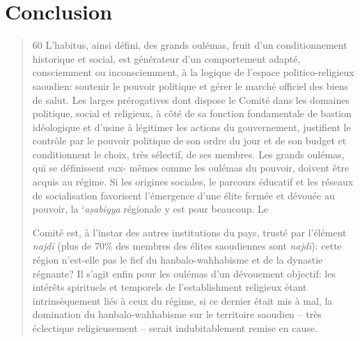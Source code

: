 \hypertarget{conclusion}{%
\section{Conclusion}\label{conclusion}}

\begin{quote}
60 L'habitus, ainsi défini, des grands oulémas, fruit d'un
conditionnement historique et social, est générateur d'un comportement
adapté, consciemment ou inconsciemment, à la logique de l'espace
politico-religieux saoudien: soutenir le pouvoir politique et gérer le
marché officiel des biens de salut. Les larges prérogatives dont dispose
le Comité dans les domaines politique, social et religieux, à côté de sa
fonction fondamentale de bastion idéologique et d'usine à légitimer les
actions du gouvernement, justifient le contrôle par le pouvoir politique
de son ordre du jour et de son budget et conditionnent le choix, très
sélectif, de ses membres. Les grands oulémas, qui se définissent eux-
mêmes comme les oulémas du pouvoir, doivent être acquis au régime. Si
les origines sociales, le parcours éducatif et les réseaux de
socialisation favorisent l'émergence d'une élite fermée et dévouée au
pouvoir, la `\emph{aṣabiyya} régionale y est pour beaucoup. Le

Comité est, à l'instar des autres institutions du pays, trusté par
l'élément \emph{najdī} (plus de 70\% des membres des élites saoudiennes
sont \emph{najdī}): cette région n'est-elle pas le fief du
hanbalo-wahhabisme et de la dynastie régnante? Il s'agit enfin pour les
oulémas d'un dévouement objectif: les intérêts spirituels et temporels
de l'establishment religieux étant intrinsèquement liés à ceux du
régime, si ce dernier était mis à mal, la domination du
hanbalo-wahhabisme sur le territoire saoudien -- très éclectique
religieusement -- serait indubitablement remise en cause.
\end{quote}

